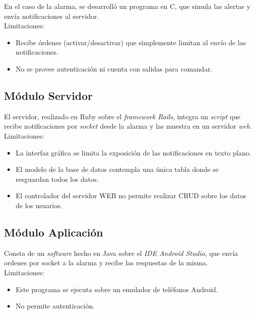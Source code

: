 En el caso de la alarma, se desarrolló un programa en C, que simula las alertas y envía notificaciones al servidor.\\
Limitaciones:
\begin{itemize}
\item Recibe órdenes (activar/desactivar) que simplemente limitan al envío de las notificaciones.
\item No se provee autenticación ni cuenta con salidas para comandar.
\end{itemize}



	\subsection{Módulo Servidor}

El servidor, realizado en Ruby sobre el \textit{framework Rails}, integra un \textit{script} que recibe notificaciones por \textit{socket} desde la alarma y las muestra en un servidor \textit{web}.\\
Limitaciones:
\begin{itemize}
\item La interfaz gráfica se limita la exposición de las notificaciones en texto plano.
\item El modelo de la base de datos contempla una única tabla donde se resguardan todos los datos.
\item El controlador del servidor WEB no permite realizar CRUD sobre los datos de los usuarios.
\end{itemize}


	\subsection{Módulo Aplicación}

Consta de un \textit{software} hecho en Java sobre el \textit{IDE Android Studio}, que envía ordenes por socket a la alarma y recibe las respuestas de la misma.\\
Limitaciones:
\begin{itemize}
\item Este programa se ejecuta sobre un emulador de teléfonos Android.
\item No permite autenticación.
\end{itemize}


